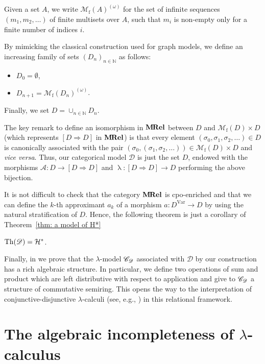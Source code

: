 \documentclass[english]{llncs}
\renewcommand{\bold}[1]{{\bf #1}}
\newcommand{\Var}{\mathrm{Var}}
\newcommand{\Mfin}[1]{\mathcal{M}_\mathrm{f}( #1 )}
\newcommand\Omegatuple[1]{\Mfin{#1}^{(\omega)}}
\newcommand{\MRel}{\bold{M\hspace{-1pt}Rel}}
\newcommand{\Funint}[2]{[{#1}\To{#2}]}
\newcommand{\To}{\Rightarrow}
\newcommand{\ro}[1]{\mathscr{#1}} \newcommand{\App}{\mathcal{A}}
\newcommand{\Abs}{\uplambda}
\newcommand{\cH}{{\cal H}}
\newcommand{\gl}{\lambda}
\newcommand{\nat}{\mathbb{N}}
\begin{document}
Given a set $A$, we write $\Omegatuple{A}$ for the set of infinite sequences $(m_1,m_2,\ldots)$ of finite multisets over $A$,
such that $m_i$ is non-empty only for a finite number of indices $i$.

By mimicking the classical construction used for graph models, we define an increasing family of sets $(D_n)_{n\in\nat}$ as follows: 
\begin{itemize}
\item $D_0=\emptyset$,
\item $D_{n+1}=\Omegatuple{D_n}$.
\end{itemize}
Finally, we set $D=\cup_{n\in\nat}D_n$.

The key remark to define an isomorphism in $\MRel$ between $D$ and $\Mfin{D}\times D$ (which represents $\Funint{D}{D}$ in $\MRel$) 
is that every element $(\sigma_0, \sigma_1, \sigma_2,\ldots)\in D$ is canonically associated with the pair $(\sigma_0, (\sigma_1, \sigma_2,\ldots))\in \Mfin{D}\times D$ and {\em vice versa}. 
Thus, our categorical model $\ro{D}$ is just the set $D$, endowed with the morphisms $\App:D\to\Funint DD$ and $\Abs:\Funint DD\to D$ performing 
the above bijection.

It is not difficult to check that the category $\MRel$ is cpo-enriched and that 
we can define the $k$-th approximant $a_k$ of a morphism $a:D^\Var\to D$ by using the natural stratification of $D$.
Hence, the following theorem is just a corollary of Theorem~\ref{thm: a model of H*}

\begin{theorem} \cite[Cor.~3.3.4]{ManzonettoTh} $\Th{\ro{D}} = \cH^*$.
\end{theorem}

Finally, in \cite[Chapter~3]{ManzonettoTh} we prove that the $\lambda$-model $\ca{C}_\ro{D}$ associated with $\ro{D}$ by our construction
has a rich algebraic structure.
In particular, we define two operations of sum and product which are left distributive with respect to application and 
give to $\ca{C}_\ro{D}$ a structure of commutative semiring. 
This opens the way to the interpretation of conjunctive-disjunctive $\lambda$-calculi (see, e.g., \cite{DezaniLP98}) 
in this relational framework.

\section{The algebraic incompleteness of $\gl$-calculus}\label{sec:The algebraic incompleteness of gl-calculus}
\end{document}
